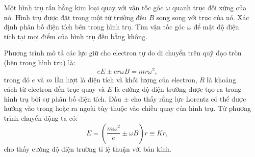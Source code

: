 \begin{vd}%
Một hình trụ rắn bằng kim loại quay với vận tốc góc $\omega$ quanh trục đối xứng của nó. Hình trụ được đặt trong một từ trường đều $B$ song song với trục của nó. Xác định phân bố điện tích bên trong hình trụ. Tìm vận tốc góc  $\omega$ để mật độ điện tích tại mọi điểm của hình trụ đều bằng không.
\end{vd}
\begin{loigiai}
Phương trình mô tả các lực giữ cho electron tự do di chuyển trên quỹ đạo tròn (bên trong hình trụ) là:
$$eE\pm er\omega B=mr{\omega^2},$$
trong đó $e$ và $m$ lần lượt là điện tích và khối lượng của electron, $R$ là khoảng cách từ electron đến trục quay và $E$ là cường độ điện trường được tạo ra trong hình trụ bởi sự phân bố điện tích. Dấu $\pm$ cho thấy rằng lực Lorentz có thể được hướng vào trong hoặc ra ngoài tùy thuộc vào chiều quay của hình trụ. Từ phương trình chuyển động ta có:
$$ E=\left(\dfrac{m{\omega^2}}{e}\pm\omega B\right)r\equiv Kr,$$
cho thấy cường độ điện trường tỉ lệ thuận với bán kính.
\begin{center}
 


\begin{tikzpicture}[x=0.75pt,y=0.75pt,yscale=-1,xscale=1]


\end{tikzpicture}
\end{center}
\end{loigiai}

